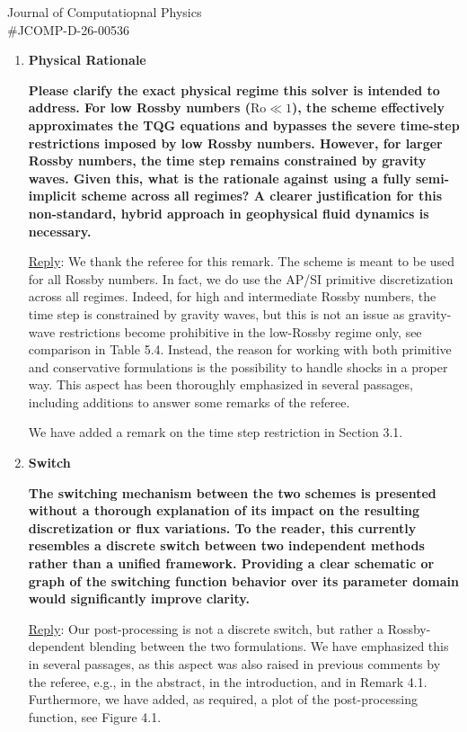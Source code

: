 \documentclass[letter,11pt]{letter}
\begin{document}
\begin{letter}{Journal of Computatiopnal Physics\\\#JCOMP-D-26-00536}
\begin{enumerate}
\medskip
\item
{\bf Physical Rationale}\medskip

{\bf Please clarify the exact physical regime this solver is intended to address. For low Rossby numbers ($\mathrm{Ro}\ll1$), the scheme effectively approximates the TQG equations and bypasses the severe time-step restrictions imposed by low Rossby numbers. However, for larger Rossby numbers, the time step remains constrained
by gravity waves. Given this, what is the rationale against using a fully semi-implicit scheme across all regimes? A clearer justification for this non-standard, hybrid approach in geophysical fluid dynamics is necessary.}

\medskip
{\sc\underline{Reply}}: We thank the referee for this remark. The scheme is meant to be used for all Rossby numbers.
%
In fact, we do use the AP/SI primitive discretization across all regimes.
%
Indeed, for high and intermediate Rossby numbers, the time step is constrained by gravity waves, but this is not an issue as gravity-wave restrictions become prohibitive in the low-Rossby regime only, see comparison in Table 5.4.
%
Instead, the reason for working with both primitive and conservative formulations is the possibility to handle shocks in a proper way.
%
This aspect has been thoroughly emphasized in several passages, including additions to answer some remarks of the referee.

We have added a remark on the time step restriction in Section 3.1.

\medskip
\item
{\bf Switch}\medskip

{\bf The switching mechanism between the two schemes is presented without a thorough explanation of its impact on the resulting discretization or flux variations. To the reader, this currently resembles a discrete switch between two independent methods rather than a unified framework. Providing a clear schematic or graph of the switching function behavior over its parameter domain would significantly improve clarity.}

\medskip
{\sc\underline{Reply}}: Our post-processing is not a discrete switch, but rather a Rossby-dependent blending between the two formulations.
%
We have emphasized this in several passages, as this aspect was also raised in previous comments by the referee, e.g., in the abstract, in the introduction, and in Remark 4.1.
%
Furthermore, we have added, as required, a plot of the post-processing function, see Figure 4.1.


\end{enumerate}
\end{letter}
\end{document}
